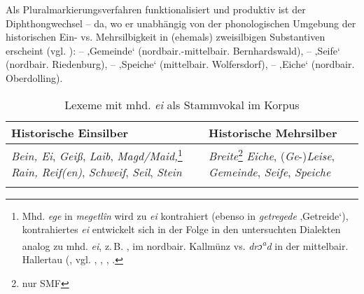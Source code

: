 Als Pluralmarkierungsverfahren funktionalisiert und produktiv ist der Diph\-thong\-wech\-sel  --  da, wo er unabhängig von der phonologischen Umgebung der historischen Ein- vs. Mehrsilbigkeit in (ehemals) zweisilbigen Substantiven erscheint (vgl. ):  --  ‚Gemeinde‘ (nordbair.-mittelbair. Bernhardswald),  --  ‚Seife‘ (nordbair. Riedenburg),  --  ‚Speiche‘ (mittelbair. Wolfersdorf),  --  ‚Eiche‘ (nordbair. Oberdolling).

\begin{table}
\begin{tabularx}{\textwidth}{QQ}
\lsptoprule
Historische Einsilber & Historische Mehrsilber\\
\midrule
\textit{Bein, Ei}, \textit{Geiß}, \textit{Laib}, \textit{Magd/Maid,}\footnote{Mhd. \textit{ege} in \textit{megetlîn} wird zu \textit{ei} kontrahiert (ebenso in \textit{getregede} ‚Getreide‘), kontrahiertes \textit{ei} entwickelt sich in der Folge in den untersuchten Dialekten analog zu mhd. \textit{ei}, z.\,B. ,  im nordbair. Kallmünz \citep[441]{Götz1987} vs. \textit{drɔ\textsuperscript{a}}\textit{d} in der mittelbair. Hallertau (\citealt[158]{Zehetner1978}, vgl. \citealt[32]{Förster1912/13}, \citealt[§81]{Gebhardt1907}, \citealt[83]{Grundler1951}, \citealt[§75d]{Micko1930}.} \textit{Rain, Reif(en)}, \textit{Schweif}, \textit{Seil}, \textit{Stein}  & \textit{Breite}\footnote{nur SMF} \textit{Eiche}, (\textit{Ge}{}-)\textit{Leise}, \textit{Gemeinde}, \textit{Seife}, \textit{Speiche}\\
\lspbottomrule
\end{tabularx}
\caption{Lexeme mit mhd. \textit{ei} als Stammvokal im Korpus}
\label{tab:21}
\end{table}


